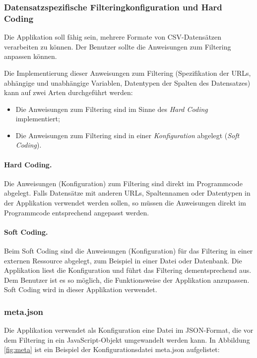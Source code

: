 \subsubsection*{Datensatzspezifische Filteringkonfiguration und Hard Coding}

Die Applikation soll fähig sein, mehrere Formate von CSV-Datensätzen verarbeiten zu können. Der Benutzer sollte die Anweisungen zum Filtering anpassen können.

Die Implementierung dieser Anweisungen zum Filtering (Spezifikation der URLs, abhängige und unabhängige Variablen, Datentypen der Spalten des Datensatzes) kann auf zwei Arten durchgeführt werden:
\newpage
\begin{itemize}
	\item Die Anweisungen zum Filtering sind im Sinne des \textit{Hard Coding} implementiert;
	\item Die Anweisungen zum Filtering sind in einer \textit{Konfiguration} abgelegt (\textit{Soft Coding}).
\end{itemize}

\paragraph{Hard Coding.} Die Anweisungen (Konfiguration) zum Filtering sind direkt im Programmcode abgelegt. Falls Datensätze mit anderen URLs, Spaltennamen oder Datentypen in der Applikation verwendet werden sollen, so müssen die Anweisungen direkt im Programmcode entsprechend angepasst werden.

\paragraph{Soft Coding.} Beim Soft Coding sind die Anweisungen (Konfiguration) für das Filtering in einer externen Ressource abgelegt, zum Beispiel in einer Datei oder Datenbank. Die Applikation liest die Konfiguration und führt das Filtering dementsprechend aus. Dem Benutzer ist es so möglich, die Funktionsweise der Applikation anzupassen. Soft Coding wird in dieser Applikation verwendet.

\subsubsection*{meta.json}

Die Applikation verwendet als Konfiguration eine Datei im JSON-Format, die vor dem Filtering in ein JavaScript-Objekt umgewandelt werden kann. In Abbildung \ref{fig:meta} ist ein Beispiel der Konfigurationsdatei meta.json aufgelistet:

